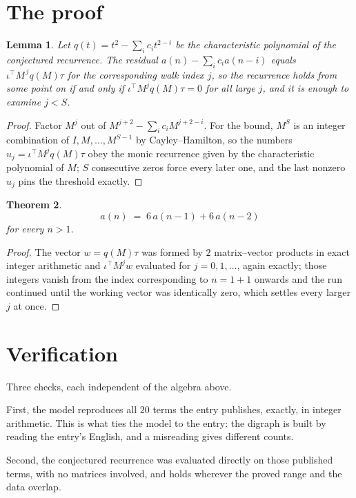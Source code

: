\documentclass[11pt,a4paper]{article}
\theoremstyle{plain}
\newtheorem{theorem}{Theorem}
\newtheorem{lemma}[theorem]{Lemma}
\theoremstyle{definition}
\begin{document}
\section{The proof}

\begin{lemma}\label{lem:crit}
Let $q(t)=t^{2}-\sum_i c_it^{2-i}$ be the characteristic polynomial of the
conjectured recurrence. The residual $a(n)-\sum_ic_ia(n-i)$ equals
$\iota^{\!\top}M^{\,j}q(M)\tau$ for the corresponding walk index $j$, so the recurrence
holds from some point on if and only if $\iota^{\!\top}M^{j}q(M)\tau=0$ for all large $j$,
and it is enough to examine $j<S$.
\end{lemma}

\begin{proof}
Factor $M^{j}$ out of $M^{j+2}-\sum_ic_iM^{j+2-i}$. For the bound, $M^{S}$
is an integer combination of $I,M,\dots,M^{S-1}$ by Cayley--Hamilton, so the numbers
$u_j=\iota^{\!\top}M^{j}q(M)\tau$ obey the monic recurrence given by the characteristic
polynomial of $M$; $S$ consecutive zeros force every later one, and the last nonzero $u_j$
pins the threshold exactly.
\end{proof}

\begin{theorem}
\[
a(n)\;=\;6\,a(n-1) + 6\,a(n-2)
\]
for every $n>1$.
\end{theorem}

\begin{proof}
The vector $w=q(M)\tau$ was formed by $2$ matrix--vector products in exact integer
arithmetic and $\iota^{\!\top}M^{j}w$ evaluated for $j=0,1,\dots$, again exactly; those
integers vanish from the index corresponding to $n=1+1$ onwards and the run continued
until the working vector was identically zero, which settles every larger $j$ at once.
\end{proof}

\section{Verification}

Three checks, each independent of the algebra above.

First, the model reproduces all $20$ terms the entry publishes, exactly, in integer
arithmetic. This is what ties the model to the entry: the digraph is built by reading the
entry's English, and a misreading gives different counts.

Second, the conjectured recurrence was evaluated directly on those published terms, with no
matrices involved, and holds wherever the proved range and the data overlap.
\end{document}
